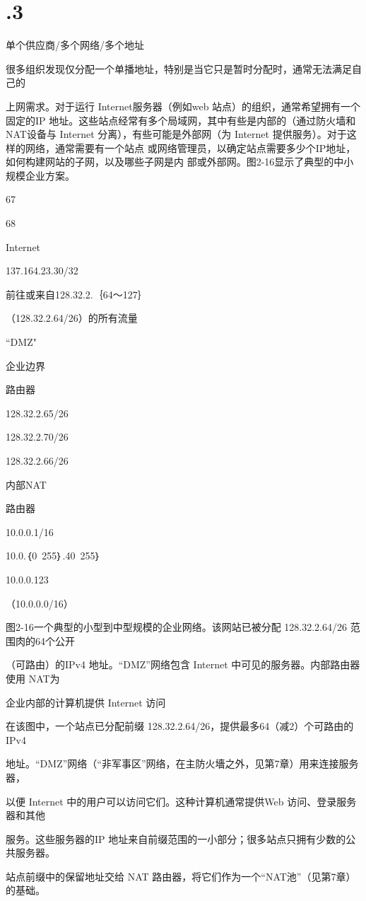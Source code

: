 \section{.3}
单个供应商/多个网络/多个地址

很多组织发现仅分配一个单播地址，特别是当它只是暂时分配时，通常无法满足自己的

上网需求。对于运行 Internet服务器（例如web 站点）的组织，通常希望拥有一个固定的IP
地址。这些站点经常有多个局域网，其中有些是内部的（通过防火墙和 NAT设备与 Internet
分离），有些可能是外部网（为 Internet 提供服务）。对于这样的网络，通常需要有一个站点
或网络管理员，以确定站点需要多少个IP地址，如何构建网站的子网，以及哪些子网是内
部或外部网。图2-16显示了典型的中小规模企业方案。

67

68

Internet

137.164.23.30/32

前往或来自128.32.2.｛64～127｝

（128.32.2.64/26）的所有流量

“DMZ"

企业边界

路由器

128.32.2.65/26

128.32.2.70/26

128.32.2.66/26

内部NAT

路由器

10.0.0.1/16

10.0.｛0~255｝.40~255｝

10.0.0.123

（10.0.0.0/16）

图2-16一个典型的小型到中型规模的企业网络。该网站已被分配 128.32.2.64/26 范围肉的64个公开

（可路由）的IPv4 地址。“DMZ”网络包含 Internet 中可见的服务器。内部路由器使用 NAT为

企业内部的计算机提供 Internet 访问

在该图中，一个站点已分配前缀 128.32.2.64/26，提供最多64（减2）个可路由的IPv4

地址。“DMZ”网络（“非军事区”网络，在主防火墻之外，见第7章）用来连接服务器，

以便 Internet 中的用户可以访问它们。这种计算机通常提供Web 访问、登录服务器和其他

服务。这些服务器的IP 地址来自前缀范围的一小部分；很多站点只拥有少数的公共服务器。

站点前缀中的保留地址交给 NAT 路由器，将它们作为一个“NAT池”（见第7章）的基础。


